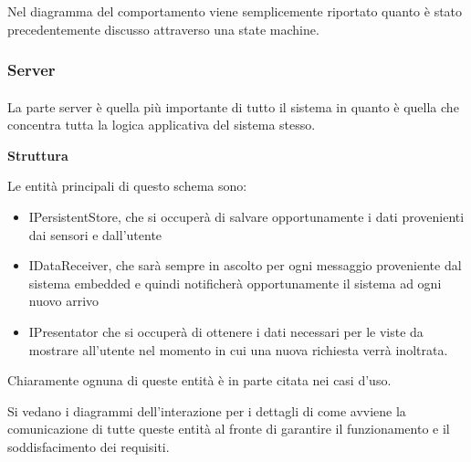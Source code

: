 Nel diagramma del comportamento viene semplicemente riportato quanto \`e stato precedentemente discusso attraverso una state machine.

\newpage

\subsubsection{Server}

\paragraph{}La parte server \`e quella pi\`u importante di tutto il sistema in quanto \`e quella che concentra tutta la logica applicativa del sistema stesso.

\begin{center}
\textbf{Struttura}
\end{center}

Le entit\`a principali di questo schema sono:
\begin{itemize}
  \item IPersistentStore, che si occuper\`a di salvare opportunamente i dati provenienti dai sensori e dall'utente
  \item IDataReceiver, che sar\`a sempre in ascolto per ogni messaggio proveniente dal sistema embedded e quindi notificher\`a opportunamente il sistema ad ogni nuovo arrivo
  \item IPresentator che si occuper\`a di ottenere i dati necessari per le viste da mostrare all'utente nel momento in cui una nuova richiesta verr\`a inoltrata.
\end{itemize}

Chiaramente ognuna di queste entit\`a \`e in parte citata nei casi d'uso.

Si vedano i diagrammi dell'interazione per i dettagli di come avviene la comunicazione di tutte queste entit\`a al fronte di garantire il funzionamento e il soddisfacimento dei requisiti.


